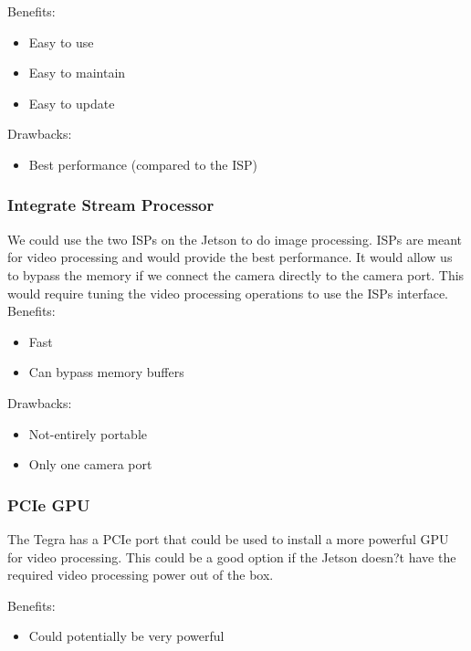	Benefits:
	\begin{itemize}[leftmargin=2cm,labelindent=2cm]
		\item Easy to use
		\item Easy to maintain
		\item Easy to update
	\end{itemize}
	
	Drawbacks:
	\begin{itemize}[leftmargin=2cm,labelindent=2cm]
		\item Best performance (compared to the ISP)\\
	\end{itemize}
	
	\subsubsection{Integrate Stream Processor}
	We could use the two ISPs on the Jetson to do image processing.
ISPs are meant for video processing and would provide the best performance. It would allow us to bypass the memory if we connect the camera directly to the camera port. This would require tuning the video processing operations to use the ISPs interface.\\
			
	Benefits:
	\begin{itemize}[leftmargin=2cm,labelindent=2cm]
		\item Fast
		\item Can bypass memory buffers
	\end{itemize}
	
	Drawbacks:
	\begin{itemize}[leftmargin=2cm,labelindent=2cm]
		\item Not-entirely portable
		\item Only one camera port\\
	\end{itemize}
	
	\subsubsection{PCIe GPU}
	The Tegra has a PCIe port that could be used to install a more powerful GPU for video processing. This could be a good option if the Jetson doesn?t have the required video processing power out of the box.
		
	Benefits:
	\begin{itemize}[leftmargin=2cm,labelindent=2cm]
		\item Could potentially be very powerful
	\end{itemize}
	
